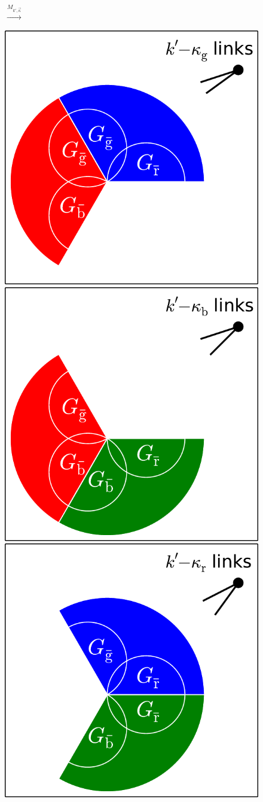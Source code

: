 \documentclass[aps, pre, onecolumn, a4paper, floatfix]{revtex4}
\begin{document}
\begin{figure}[htb]
\begin{minipage}[b]{0.245\linewidth}
  \end{minipage}
  \begin{minipage}[b]{0.1\linewidth}
    \begin{center}
      {\Large $\xrightarrow{M_{k',\vec{\kappa}}}$}\\
      \vspace{20mm}
    \end{center}
  \end{minipage}
  \begin{minipage}[b]{0.6\linewidth}
    \begin{center}
    \includegraphics[height=0.4\columnwidth]{sets_k_no_2_gc.pdf}
     \hspace{-1mm}
    \includegraphics[trim=100 0 0 0,clip,height=0.4\columnwidth]{sets_k_no_3_gc.pdf}
     \hspace{-1mm}
    \includegraphics[trim=100 0 0 0,clip,height=0.4\columnwidth]{sets_k_no_1_gc.pdf}
   \end{center}

\end{minipage}
\end{figure}
\end{document}
